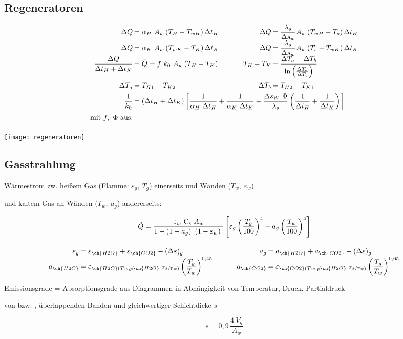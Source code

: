 \clearpage
\subsection{Regeneratoren}
	\[ \arraycolsep=0.1em  \def\arraystretch{1.6}
	\begin{array}{r l p{3em} r l}
		\Delta Q                                      & = \alpha_H\ A_w  \left(T_H - T_{wH}\right) \Delta t_H  &  & \Delta Q      & = \dfrac{\lambda_s}{\Delta s_w} A_w \left(T_{wH} - T_s\right) \Delta t_H                  \\
		\Delta Q                                      & = \alpha_K\ A_w  \left(T_{wK} - T_K\right) \Delta t_K  &  & \Delta Q      & = \dfrac{\lambda_s}{\Delta s_w} A_w \left(T_s - T_{wK}\right) \Delta t_K                  \\
		\dfrac{\Delta Q}{\Delta t_{H} + \Delta t_{K}} & = \dot{Q} = f\ k_0\ A _{w} \left( T_{H} - T_{K}\right) &  & T_{H} - T_{K} & = \dfrac{\Delta T_{a} - \Delta T_{b}}{\ln \left(\frac{\Delta T_{a}}{\Delta T_{b}}\right)} \\
		\Delta T_{a}                                  & = T_{H1} - T_{K2}                                      &  & \Delta T_{b}  & = T_{H2} - T_{K1} \\
		\dfrac{1}{k_0} & \multicolumn{4}{l}{= \left(\Delta t_{H} + \Delta t_{K}\right)  \left[\dfrac{1}{\alpha_{H}\ \Delta t_{H}} + \dfrac{1}{\alpha_{K}\ \Delta t_{K}} + \dfrac{\Delta s_{W}\ \Phi}{\lambda_{s}}  \left(\dfrac{1}{\Delta t_{H}}+\dfrac{1}{\Delta t_{K}}\right) \right]} \\
		 \text{mit } f,\ \Phi \text{ aus:}
	\end{array}\]


	\texttt{[image: regeneratoren]}
\subsection{Gasstrahlung}
	Wärmestrom zw. heißem Gas (Flamme: $ \varepsilon_g,\ T_g $) einerseits und Wänden ($ T_w,\ \varepsilon_w $)

	und kaltem Gas an Wänden ($ T_w,\ a_g $) andererseits:

	\skipabove{0pt}
	\[ \dot{Q} = \dfrac{\varepsilon_w\ \Cs\ A_w}{1-\left(1-a_g\right)\ (1-\varepsilon_w)\ } \left[ \varepsilon_g \left( \dfrac{T_g}{100} \right)^4 - a_g \left( \dfrac{T_w}{100} \right)^4 \right] \]

	\[ \arraycolsep=0.1em  \def\arraystretch{1.3}
	\begin{array}{r l p{3em} r l}
		\varepsilon_g & = \varepsilon_{\ch{H2O}} + \varepsilon_{\ch{CO2}} - (\Delta\varepsilon)_g                           &  & a_g           & = a_{\ch{H2O}} + a_{\ch{CO2}} - (\Delta \varepsilon)_g                                              \\
		a _{\ch{H2O}} & = \varepsilon_{ \ch{H2O} ( Tw , p \ch{H2O}\ \sfrac{Tg}{Tw})}  \left(\dfrac{T_g}{T_w}\right) ^{0,45} &  & a _{\ch{CO2}} & = \varepsilon_{ \ch{CO2} ( Tw , p \ch{H2O}\ \sfrac{Tg}{Tw})}  \left(\dfrac{T_g}{T_w}\right) ^{0,65}
	\end{array}\]



	Emissionsgrade = Absorptionsgrade aus Diagrammen in Abhängigkeit von Temperatur, Druck, Partialdruck

	von  bzw. , überlappenden Banden und gleichwertiger Schichtdicke $ s $

	\[ s= 0,9\, \dfrac{4\ V_g}{A_w} \]



